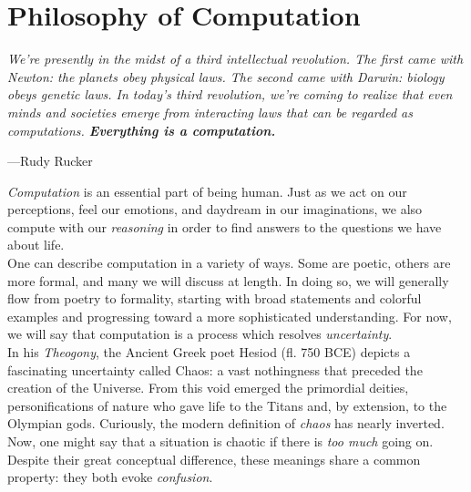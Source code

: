 
\part*{Philosophy of Computation}

\vspace{4mm}
\begin{displayquote}
	\textit{We're presently in the midst of a third intellectual revolution. The first came with Newton: the planets obey physical laws. The second came with Darwin: biology obeys genetic laws. In today’s third revolution, we're coming to realize that even minds and societies emerge from interacting laws that can be regarded as computations. \textbf{Everything is a computation.}}
	\vspace{2mm}
	\begin{flushright}
		---Rudy Rucker
	\end{flushright}
\end{displayquote}
\vspace{4mm}

\textit{Computation} is an essential part of being human. Just as we act on our perceptions, feel our emotions, and daydream in our imaginations, we also compute with our \textit{reasoning} in order to find answers to the questions we have about life. \\

One can describe computation in a variety of ways. Some are poetic, others are more formal, and many we will discuss at length. In doing so, we will generally flow from poetry to formality, starting with broad statements and colorful examples and progressing toward a more sophisticated understanding. For now, we will say that computation is a process which resolves \textit{uncertainty}. \\

In his \textit{Theogony}, the Ancient Greek poet Hesiod (fl. 750 BCE) depicts a fascinating uncertainty called Chaos: a vast nothingness that preceded the creation of the Universe. From this void emerged the primordial deities, personifications of nature who gave life to the Titans and, by extension, to the Olympian gods. Curiously, the modern definition of \textit{chaos} has nearly inverted. Now, one might say that a situation is chaotic if there is \textit{too much} going on. Despite their great conceptual difference, these meanings share a common property: they both evoke \textit{confusion}. \\

